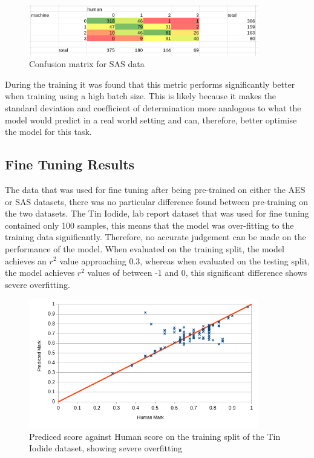 \documentclass[11pt]{article}
\begin{document}
\begin{figure}[htbp]
\centering
\includegraphics[width=10cm]{./exp5_sas_confusion.png}
\caption{Confusion matrix for SAS data}
\end{figure}

During the training it was found that this metric performs significantly better when training using a high batch size. This is likely because it makes the standard deviation and coefficient of determination more analogous to what the model would predict in a real world setting and can, therefore, better optimise the model for this task.

\subsection{Fine Tuning Results}
\label{sec:org46b9966}
The data that was used for fine tuning after being pre-trained on either the AES or SAS datasets, there was no particular difference found between pre-training on the two datasets. The Tin Iodide, lab report dataset that was used for fine tuning contained only 100 samples, this means that the model was over-fitting to the training data significantly. Therefore, no accurate judgement can be made on the performance of the model. When evaluated on the training split, the model achieves an \(r^2\) value approaching 0.3, whereas when evaluated on the testing split, the model achieves \(r^2\) values of between -1 and 0, this significant difference shows severe overfitting.

\begin{figure}[htbp]
\centering
\includegraphics[width=10cm]{./exp5_fine_dist_train.png}
\caption{Prediced score against Human score on the training split of the Tin Iodide dataset, showing severe overfitting \label{fig:overfit}}
\end{figure}
\end{document}
